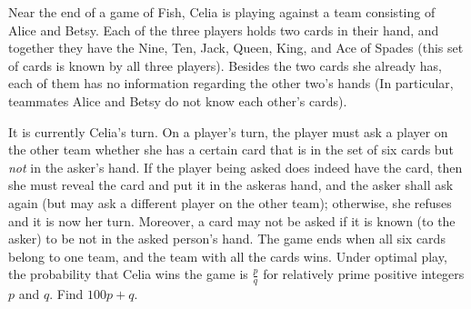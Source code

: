 Near the end of a game of Fish, Celia is playing against a team consisting of Alice and Betsy. Each of the three players holds two cards in their hand, and together they have the Nine, Ten, Jack, Queen, King, and Ace of Spades (this set of cards is known by all three players). Besides the two cards she already has, each of them has no information regarding the other two's hands (In particular, teammates Alice and Betsy do not know each other's cards). 

It is currently Celia's turn. On a player's turn, the player must ask a player on the other team whether she has a certain card that is in the set of six cards but \emph{not} in the asker's hand. If the player being asked does indeed have the card, then she must reveal the card and put it in the askeras hand, and the asker shall ask again (but may ask a different player on the other team); otherwise, she refuses and it is now her turn. Moreover, a card may not be asked if it is known (to the asker) to be not in the asked person's hand. The game ends when all six cards belong to one team, and the team with all the cards wins. Under optimal play, the probability that Celia wins the game is $\frac{p}{q}$ for relatively prime positive integers $p$ and $q$. Find $100p+q$.
